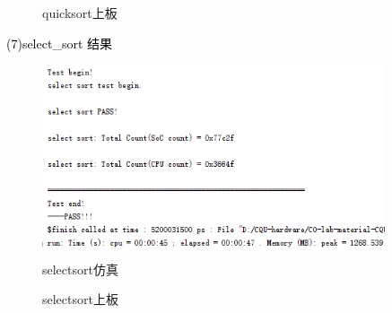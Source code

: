 \begin{figure}[htbp]
    \centering
    \caption{quicksort上板}
\end{figure}

\newpage
\textcolor{black}{(7)select\_sort 结果}\\
\begin{figure}[htbp]
    \centering
    \includegraphics[width=0.9\textwidth]{image/selectsortS.png}
    \caption{selectsort仿真}
\end{figure}

\begin{figure}[htbp]
    \centering
    \caption{selectsort上板}
\end{figure}

